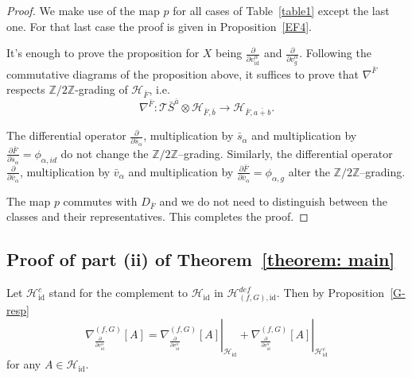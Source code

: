 \documentclass[reqno,12pt]{amsart}
\numberwithin{equation}{section}
\theoremstyle{plain}
\theoremstyle{definition}
\newcommand{\CC}{{\mathbb{C}}}
\newcommand{\ZZ}{{\mathbb{Z}}}
\newcommand{\Jac}{\mathrm{Jac}}
\newcommand{\id}{\mathrm{id}}
\def\H{{\mathcal H}}
\def\T{{\mathcal T}}
\numberwithin{equation}{section}
\begin{document}
\begin{proof}
We make use of the map $p$ for all cases of Table~\ref{table1} except the last one. For that last case the proof is given in Proposition~\ref{EF4}.

It's enough to prove the proposition for $X$ being $ \frac{\partial}{\partial v^\alpha_{\id}}$ and $\frac{\partial}{\partial v^\alpha_{g}}$.
Following the commutative diagrams of the proposition above, it suffices to prove that $\nabla^{\bar{F}}$ respects $\ZZ/2\ZZ$-grading of $\H_{\bar{F}}$, i.e.
\[
\nabla^{\bar{F}}: \T \bar{S}^{\bar{a}} \otimes  \H_{\bar{F},\bar{b}} \to \H_{\bar{F},\overline{a+b}}.
\]

The differential operator $\frac{\partial}{\partial \bar{s}_\alpha}$, multiplication by $\bar{s}_\alpha$ and multiplication by $\frac{\partial \bar{F}}{\partial \bar{s}_\alpha} = \phi_{\alpha,id}$ 
do not change the $\ZZ/2\ZZ$--grading. 
Similarly, the differential operator $\frac{\partial}{\partial \bar{v}_\alpha}$, multiplication by $\bar{v}_\alpha$  and multiplication by $\frac{\partial \bar{F}}{\partial \bar{v}_\alpha} = \phi_{\alpha,g}$ 
alter the $\ZZ/2\ZZ$--grading. 

The map $p$ commutes with $D_{\bar F}$ and we do not need to distinguish between the classes and their representatives. This completes the proof.
\end{proof}

\subsection*{Proof of part (ii) of Theorem~\ref{theorem: main}}

Let $\H^c_{\id}$ stand for the complement to $\H_\id$ in $\H^{def}_{(f,G),\id}$. Then by Proposition~\ref{G-resp}
\[
\nabla_{\frac{\partial}{\partial v^\alpha_{\id}}}^{(f,G)}[A] 
    = \left.\nabla_{\frac{\partial}{\partial v^\alpha_{\id}}}^{(f,G)}[A]\right\vert_{\H_{\id}}  
    + \left.\nabla_{\frac{\partial}{\partial v^\alpha_{\id}}}^{(f,G)}[A]\right\vert_{\H^c_{\id}}
\]
for any $A \in \H_\id$.
\end{document}

